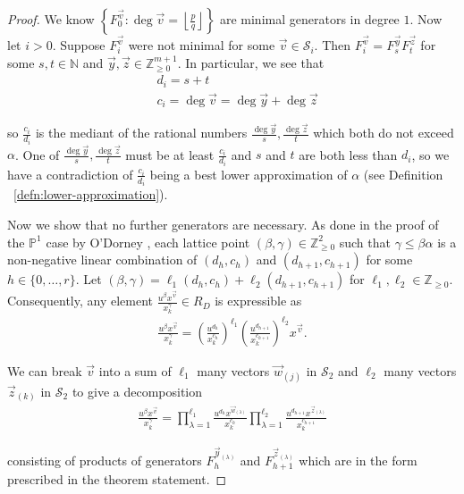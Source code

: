 \documentclass{amsart}
\theoremstyle{plain}
\theoremstyle{definition}
\theoremstyle{remark}
\numberwithin{equation}{section}
\newcommand\bn{{\mathbb N}}
\newcommand\bp{{\mathbb P}}
\newcommand\bz{{\mathbb Z}}
\newcommand\mss{\mathscr{S}}
\begin{document}
\begin{proof}
We know $\left\{F_{0}^{\vec{v}} : \deg \vec{v} = \left\lfloor
\frac{p}{q} \right\rfloor \right\}$ are minimal generators in
degree $1$. Now let $i > 0$. Suppose $F_i^{\vec{v}}$ were not
minimal for some $\vec{v} \in \mss_i$. Then $F_i^{\vec{v}} =
F_{s}^{\vec{y}} F_{t}^{\vec{z}}$ for some $s, t \in \bn$ and
$\vec{y}, \vec{z} \in \bz_{ \geq 0}^{m + 1}$. In particular, we see
that 
\begin{align*}
	&d_i = s + t \\
	&c_i = \deg \vec{v} = \deg \vec{y} + \deg \vec{z}
\end{align*}

\noindent
so $\frac{c_i}{d_i}$ is the mediant of the rational numbers
$\frac{\deg \vec{y}}{s}, \frac{\deg \vec{z}}{t}$ which both
do not exceed $\alpha$. One of $\frac{\deg \vec{y}}{s},
\frac{\deg \vec{z}}{t}$ must be at least $\frac{c_i}{d_i}$
and $s$ and $t$ are both less than $d_i$, so we have a contradiction 
of $\frac{c_i}{d_i}$ being a best lower approximation of $\alpha$
(see Definition ~\ref{defn:lower-approximation}).

Now we show that no further generators are necessary. As done in
the proof of the $\bp^1$ case by O'Dorney \cite[Theorem 6]
{dorney:canonical}, each lattice point $(\beta, \gamma) \in
\bz_{\geq 0}^2$ such that $\gamma \leq \beta \alpha$ is a non-negative
linear combination of $(d_h, c_h)$ and $(d_{h + 1}, c_{h + 1})$ for
some $h \in \{0, \ldots, r\}$. Let $(\beta, \gamma) = \ell_1
(d_h, c_h) + \ell_2 (d_{h + 1}, c_{h + 1})$ for $\ell_1, \ell_2 \in
\bz_{\geq 0}$. Consequently, any element $\frac{u^{\beta}
x^{\vec{v}}} {x_k^{ \gamma}} \in R_D$ is expressible as
\begin{align*}
	\frac{u^{\beta} x^{\vec{v}}} {x_k^{\gamma}} = \left(\frac{u^{d_h}}
	{x_k^{c_h}}\right)^{\ell_1} \left(\frac{u^{d_{h + 1}}}
	{x_k^{c_{h + 1}}}\right)^{\ell_2} x^{\vec{v}}.
\end{align*}

\noindent
We can break $\vec{v}$ into a sum of $\ell_1$ many vectors
$\vec{w}_{(j)}$ in $\mss_2$ and $\ell_2$ many vectors $\vec{z}_{(k)}$
in $\mss_2$ to give a decomposition
\begin{align*}
	\frac{u^{\beta} x^{\vec{v}}} {x_k^{\gamma}}	= \prod_{\lambda = 1}
	^{\ell_1} \frac{u^{d_h} x^{\vec{w}_{(\lambda)}}} {x_k^{c_h}}
	\prod_{\lambda = 1}^{\ell_2} \frac{u^{d_{h + 1}} x^{\vec{z}_{(\lambda)}}}
	{x_k^{c_{h + 1}}}
\end{align*}

\noindent
consisting of products of generators $F_h^{\vec{y}_{(\lambda)}}$
and $F_{h + 1}^{\vec{z}_{(\lambda)}}$ which are in the form
prescribed in the theorem statement.


\end{proof}
\end{document}
